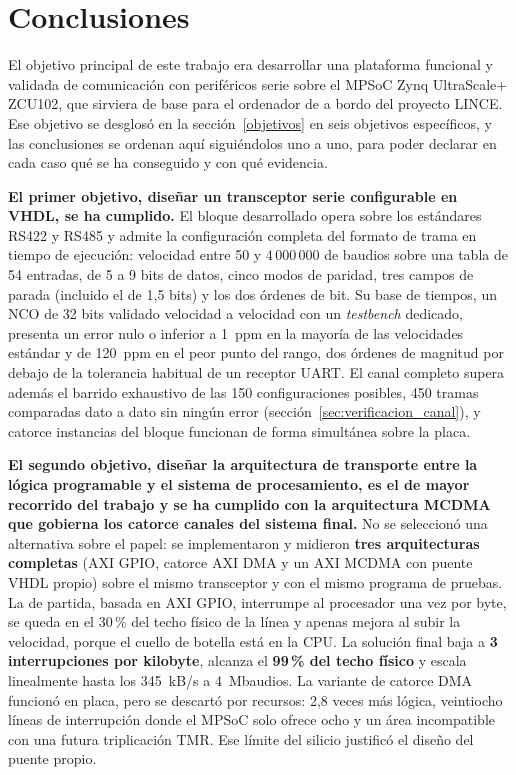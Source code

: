 \section{Conclusiones}

El objetivo principal de este trabajo era desarrollar una plataforma funcional y validada de
comunicación con periféricos serie sobre el MPSoC Zynq UltraScale+ ZCU102, que sirviera de base
para el ordenador de a bordo del proyecto LINCE. Ese objetivo se desglosó en la
sección~\ref{objetivos} en seis objetivos específicos, y las conclusiones se ordenan aquí
siguiéndolos uno a uno, para poder declarar en cada caso qué se ha conseguido y con qué evidencia.

\textbf{El primer objetivo, diseñar un transceptor serie configurable en VHDL, se ha cumplido.}
El bloque desarrollado opera sobre los estándares RS422 y RS485 y admite la configuración completa
del formato de trama en tiempo de ejecución: velocidad entre 50 y 4\,000\,000 de baudios sobre una
tabla de 54 entradas, de 5 a 9 bits de datos, cinco modos de paridad, tres campos de parada
(incluido el de 1,5 bits) y los dos órdenes de bit. Su base de tiempos, un NCO de 32 bits validado
velocidad a velocidad con un \textit{testbench} dedicado, presenta un error nulo o inferior a
1~ppm en la mayoría de las velocidades estándar y de 120~ppm en el peor punto del rango, dos
órdenes de magnitud por debajo de la tolerancia habitual de un receptor UART. El canal completo
supera además el barrido exhaustivo de las 150 configuraciones posibles, 450 tramas comparadas dato
a dato sin ningún error (sección~\ref{sec:verificacion_canal}), y catorce instancias del bloque
funcionan de forma simultánea sobre la placa.

\textbf{El segundo objetivo, diseñar la arquitectura de transporte entre la lógica programable y
el sistema de procesamiento, es el de mayor recorrido del trabajo y se ha cumplido con la
arquitectura MCDMA que gobierna los catorce canales del sistema final.} No se seleccionó una
alternativa sobre el papel: se implementaron y midieron
\textbf{tres arquitecturas completas} (AXI GPIO, catorce AXI DMA y un AXI MCDMA con puente VHDL
propio) sobre el mismo transceptor y con el mismo programa de pruebas. La de partida, basada en AXI
GPIO, interrumpe al procesador una vez por byte, se queda en el 30\,\% del techo físico de la línea
y apenas mejora al subir la velocidad, porque el cuello de botella está en la CPU. La solución final
baja a \textbf{3 interrupciones por kilobyte}, alcanza el \textbf{99\,\% del techo físico} y escala
linealmente hasta los 345~kB/s a 4~Mbaudios. La variante de catorce DMA funcionó en placa, pero se
descartó por recursos: 2,8 veces más lógica, veintiocho líneas de interrupción donde el MPSoC solo
ofrece ocho y un área incompatible con una futura triplicación TMR. Ese límite del silicio justificó
el diseño del puente propio.

